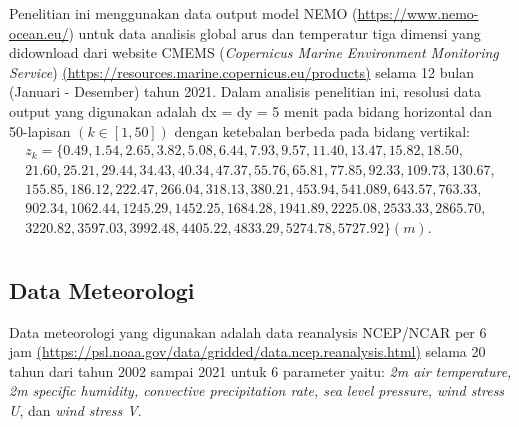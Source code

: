 \begin{spacing}{1.5}
	Penelitian ini menggunakan data output model NEMO (\href{https://www.nemo-ocean.eu/}{https://www.nemo-ocean.eu/}) untuk data analisis global arus dan temperatur tiga dimensi yang didownload dari website CMEMS (\textit{Copernicus Marine Environment Monitoring Service}) \href{https://resources.marine.copernicus.eu/products}{(https://resources.marine.copernicus.eu/products)} selama 12 bulan (Januari - Desember) tahun 2021.  Dalam analisis penelitian ini, resolusi data output yang digunakan adalah dx = dy = 5 menit pada bidang horizontal dan 50-lapisan $(k \in [1,50])$ dengan ketebalan berbeda pada bidang vertikal:
	\begin{equation*}
		\begin{aligned}
			z_k = \{0.49, 1.54, 2.65, 3.82, 5.08, 6.44, 7.93, 9.57, 11.40, 13.47, 15.82, 18.50, \\
			21.60, 25.21, 29.44, 34.43, 40.34, 47.37, 55.76, 65.81, 77.85, 92.33, 109.73, 130.67, \\
			155.85, 186.12, 222.47, 266.04, 318.13, 380.21, 453.94, 541.089, 643.57, 763.33, \\
			902.34, 1062.44, 1245.29, 1452.25, 1684.28, 1941.89, 2225.08, 2533.33, 2865.70,  \\
			3220.82, 3597.03, 3992.48, 4405.22, 4833.29, 5274.78, 5727.92 \} (m). \\
		\end{aligned}
	\end{equation*}

\subsection[Data Meteorologi]{Data Meteorologi}
	Data meteorologi yang digunakan adalah data reanalysis NCEP/NCAR per 6 jam \href{https://psl.noaa.gov/data/gridded/data.ncep.reanalysis.html}{(https://psl.noaa.gov/data/gridded/data.ncep.reanalysis.html)} selama 20 tahun dari tahun 2002 sampai 2021 untuk 6 parameter yaitu: \textit{2m air temperature, 2m specific humidity, convective precipitation rate, sea level pressure, wind stress U}, dan \textit{wind stress V}.
\end{spacing}
\vspace{-0.5pc}
